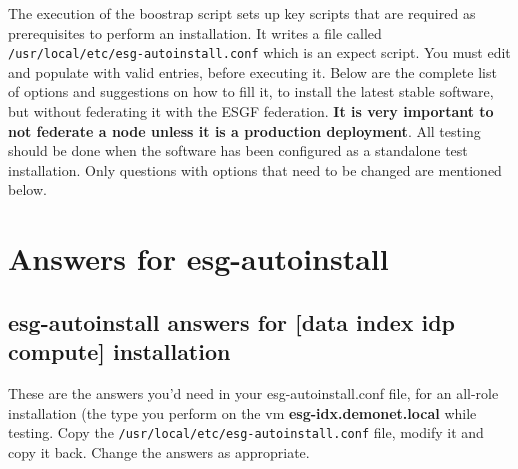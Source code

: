 The execution of the boostrap script sets up key scripts that are
  required as prerequisites to perform an installation. It writes a file
  called \texttt{/usr/local/etc/esg-autoinstall.conf} which is an expect
  script. You must edit and populate with valid entries, before
  executing it. Below are the complete list of options and suggestions
  on how to fill it, to install the latest stable software, but without
  federating it with the ESGF federation. \textbf{It is very important
  to not federate a node unless it is a production deployment}. All
  testing should be done when the software has been configured as a
  standalone test installation. Only questions with options that need to
  be changed are mentioned below.

\section{Answers for esg-autoinstall}
\subsection{esg-autoinstall answers for [data index idp compute] installation}

These are the answers you'd need in your esg-autoinstall.conf file, for an all-role installation (the type you perform on the vm \textbf{esg-idx.demonet.local} while testing. Copy the \texttt{/usr/local/etc/esg-autoinstall.conf} file, modify it and copy it back. Change the answers as appropriate.

